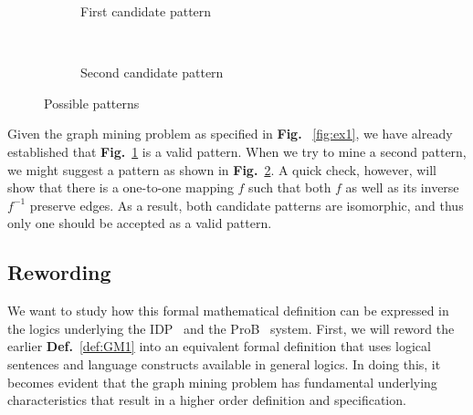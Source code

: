 \begin{figure}[h]
  \centering
  \begin{subfigure}[b]{0.45\textwidth}
    \centering
    \caption{First candidate pattern\label{fig:iso1}}
  \end{subfigure}
  ~
  \begin{subfigure}[b]{0.45\textwidth}
    \centering
    \caption{Second candidate pattern\label{fig:iso2}}
  \end{subfigure}
  \caption{Possible patterns\label{fig:isomorphism}}
\end{figure}

Given the graph mining problem as specified in \textbf{Fig.} ~\ref{fig:ex1}, we have already established that \textbf{Fig.}~\ref{fig:iso1} is a valid pattern.
When we try to mine a second pattern, we might suggest a pattern as shown in \textbf{Fig.}~\ref{fig:iso2}.
A quick check, however, will show that there is a one-to-one mapping $f$ such that both $f$ as well as its inverse $f^{-1}$ preserve edges.
As a result, both candidate patterns are isomorphic, and thus only one should be accepted as a valid pattern.

\subsection{Rewording}
We want to study how this formal mathematical definition can be expressed in the logics underlying the IDP~\citep{WarrenBook/DeCatBBD16} and the ProB~\citep{LeuschelSchneider_ABZ14} system.
First, we will reword the earlier \textbf{Def.}~\ref{def:GM1} into an equivalent formal definition that uses logical sentences and language constructs available in general logics.
In doing this, it becomes evident that the graph mining problem has fundamental underlying characteristics that result in a higher order definition and specification.


